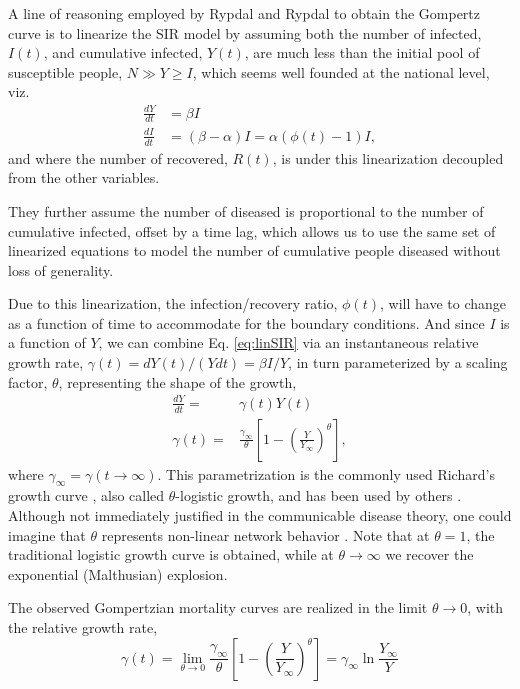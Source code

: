 \documentclass[review]{elsarticle}
\begin{document}
A line of reasoning employed by Rypdal and Rypdal \cite{Rypdal2020} to obtain the Gompertz curve is to linearize the SIR model by assuming
both the number of infected, $I(t)$, and cumulative infected, $Y(t)$, are much less than the initial pool of susceptible people, $N \gg Y \ge I$, which seems well founded at the national level, viz.
\begin{align}
\label{eq:linSIR}
\frac{dY}{dt}& = \beta I\\
\frac{dI}{dt}& = (\beta - \alpha) I = \alpha (\phi(t) - 1) I,
\end{align}
and where the number of recovered, $R(t)$, is under this linearization decoupled from the other variables. 

They further assume the number of diseased is proportional to the number of cumulative infected, offset by a time lag, which allows us to use the same set of linearized equations to model the number of cumulative people diseased without loss of generality.

 Due to this linearization, the infection/recovery ratio, $\phi(t)$, will have to change as a function of time to accommodate for the boundary conditions. And since $I$ is a function of $Y$, we can combine Eq. \ref{eq:linSIR} via an instantaneous relative growth rate, $\gamma(t) = dY(t) /(Ydt) = \beta I / Y$, in turn parameterized by a scaling factor, $\theta$, representing the shape of the growth,
\begin{subequations}
\label{eq:rypdal}
\begin{align}
\frac{dY}{dt} =& \gamma(t) Y(t) \label{eq:rypdalODE}\\
\gamma(t) =& \frac{\gamma_{\infty}}{\theta}\left[1 - \left(\frac{Y}{Y_{\infty}}\right)^{\theta} \right] \label{eq:rypdalGamma},
\end{align}
\end{subequations}
where $\gamma_{\infty} = \gamma(t\rightarrow \infty)$. This parametrization is the commonly used Richard's growth curve \citep{richards1959flexible}, also called $\theta$-logistic growth, and has been used by others \citep{wu2020generalized}. Although not immediately justified in the communicable disease theory, one could imagine that $\theta$ represents non-linear network behavior \citep{petroni2020logistic}. Note that at $\theta=1$, the traditional logistic growth curve is obtained, while at $\theta\rightarrow \infty$ we recover the exponential (Malthusian) explosion.

The observed Gompertzian mortality curves are realized in the limit $\theta \rightarrow 0$, with the relative growth rate, 
\begin{equation}
\label{eq:rypdalLimit}
\gamma(t) = \lim_{\theta \rightarrow 0}\frac{\gamma_{\infty}}{\theta}\left[1 - \left(\frac{Y}{Y_{\infty}}\right)^{\theta} \right]
= \gamma_{\infty}\ln{\frac{Y_{\infty}}{Y}}
\end{equation}
\end{document}
